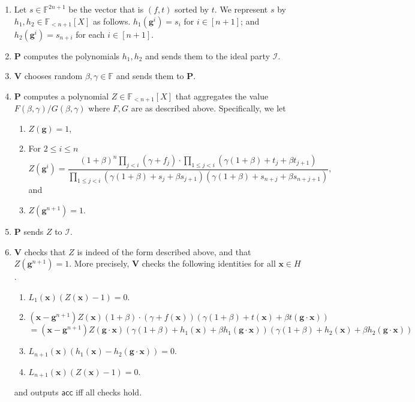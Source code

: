 \documentclass[11pt]{article} %
\newcommand{\F}{\ensuremath{\mathbb F}\xspace}
\newcommand{\acc}{\ensuremath{\mathsf{acc}}\xspace}
\newcommand{\dom}{\ensuremath{H}\xspace}
\newcommand{\prv}{\ensuremath{\mathsf{\mathbf{P}}}\xspace}
\newcommand{\prvpoly}{\ensuremath{\prv}\xspace}
\newcommand{\verpoly}{\ensuremath{\ver}\xspace}%
\newcommand{\ideal}{\ensuremath{\mathcal{I}}\xspace}
\newcommand{\ver}{\ensuremath{\mathsf{\mathbf{V}}}\xspace}
\newcommand{\hgen}{\ensuremath{\mathbf{g}}\xspace}
\newcommand{\cosetgen}{\ensuremath{\mathbf{\kappa}}\xspace}
\newcommand{\polysofdeg}[1]{\ensuremath{\F_{< #1}[X]}\xspace}
\newcommand{\sone}{\ensuremath{ h_1}\xspace}
\newcommand{\stwo}{\ensuremath{ h_{2}}\xspace}
\newcommand{\X}{\ensuremath{ {\mathbf{x}}}\xspace}
\begin{document}
\begin{enumerate}
 \item Let $s\in \F^{2n+1}$ be the vector that is $(f,t)$ sorted by $t$. We represent $s$ by $\sone,\stwo \in \polysofdeg{n+1}$ as follows.
$\sone (\hgen^i) = s_i$ for $i\in [n+1]$; and $\stwo(\hgen ^i)= s_{n+i}$ for each $i\in [n+1]$.
 
 \item \prvpoly computes the polynomials $\sone,\stwo$ and sends them to the ideal party \ideal.
 \item \verpoly chooses random $\beta,\gamma \in \F$ and sends them to \prvpoly.
 \item \prvpoly computes a polynomial $Z\in \polysofdeg{n+1}$ that aggregates the value $F(\beta,\gamma)/G(\beta,\gamma)$ where $F,G$ are as described above. Specifically, we let
\begin{enumerate}
 \item  $Z(\hgen) = 1$,
\item For $2\leq i \leq n$
\[Z(\hgen^{i})= \frac{(1+\beta)^n \prod_{j < i} (\gamma + f_j)\cdot \prod_{1\leq j < i} (\gamma(1+\beta)+ t_j + \beta t_{j+1})}{\prod_{1\leq j <i} (\gamma(1+\beta)+ s_j + \beta s_{j+1})(\gamma(1+\beta)+ s_{n+j} + \beta s_{n+j+1})},\]
 and
\item $Z(\hgen^{n+1})=1$.
\end{enumerate}
 \item \prvpoly sends $Z$ to \ideal.
 \item \verpoly checks that $Z$ is indeed of the form described above, and that $Z(\hgen^{n+1})=1$. More precisely, \verpoly checks the following identities for all $\X\in H$.
 \begin{enumerate}
  \item $L_1(\X)(Z(\X)-1)= 0$.
  \item 
  \[(\X-\hgen^{n+1})Z(\X)(1+\beta)\cdot (\gamma + f(\X))(\gamma(1+\beta)+ t(\X)+\beta t(\hgen \cdot \X) )\]
  \[= (\X-\hgen^{n+1}) Z(\hgen\cdot \X)(\gamma(1+\beta)+ \sone(\X)+\beta \sone(\hgen \cdot \X))(\gamma(1+\beta)+ \stwo(\X)+\beta \stwo(\hgen \cdot \X))\]
  \item\label{check:consist} $L_{n+1}(\X)(\sone(\X)-\stwo(\hgen \cdot \X))= 0$.
  \item $L_{n+1}(\X)(Z(\X)-1)= 0$.
 
 \end{enumerate}

 and outputs \acc iff all checks hold.
\end{enumerate}
\end{document}
